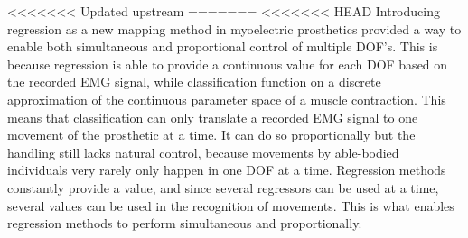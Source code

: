 <<<<<<< Updated upstream
=======
<<<<<<< HEAD
Introducing regression as a new mapping method in myoelectric prosthetics provided a way to enable both simultaneous and proportional control of multiple DOF's. This is because regression is able to provide a continuous value for each DOF based on the recorded EMG signal, while classification function on a discrete approximation of the continuous parameter space of a muscle contraction. \cite{hahne2014, jiang2010} This means that classification can only translate a recorded EMG signal to one movement of the prosthetic at a time. It can do so proportionally but the handling still lacks natural control, because movements by able-bodied individuals very rarely only happen in one DOF at a time. Regression methods constantly provide a value, and since several regressors can be used at a time, several values can be used in the recognition of movements. This is what enables regression methods to perform simultaneous and proportionally. 


